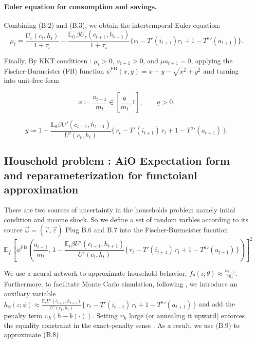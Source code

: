 \documentclass[11pt]{article}
\begin{document}
\paragraph{Euler equation for consumption and savings.}
Combining (B.2) and (B.3), we obtain the intertemporal Euler equation:
\begin{equation}
\mu_t 
= \frac{U_c(c_t,h_t)}{1+\tau_s}
- \frac{\mathbb{E}_0 \, \beta U_c(c_{t+1},h_{t+1})}{1+\tau_s}
\Big\{ r_t - T'(i_{t+1})r_t + 1 - {T^a}'(a_{t+1}) \Big\}.
\end{equation}

Finally, By KKT conditiosn : $\mu_t>0$, $a_{t+1}>0$, and $\mu a_{t+1}=0$, applying the Fischer-Burmeister (FB) function $\psi^{\text{FB}}(x, y) = x+y-\sqrt{x^2+y^2} $ and turning into unit-free form 

\begin{equation}
x \coloneqq \frac{a_{t+1}}{m_t}\in [\frac{\underline{a}}{m_t}, 1], 
\qquad \underline{a} > 0.
\end{equation}

\begin{equation}
y \coloneqq 
1 - \frac{\mathbb{E}_0 \beta U'(c_{t+1},h_{t+1})}{U'(c_t,h_t)}
\Big\{\, r_t - T'(i_{t+1})\,r_t + 1 - {T^a}'(a_{t+1}) \,\Big\}.
\end{equation}

\pagebreak

\subsection{Household problem : AiO Expectation form and reparameterization for functoianl approximation}
There are two sources of uncertainty in the households problem namely intial condition and income shock.
So we define a set of random varbles according to its source $\vec{\omega}=(\vec{\iota }, \vec{\varepsilon })$
Plug B.6 and B.7 into the Fischer-Burmeister fucntion
\begin{equation}
\mathbb{E}_{\vec{\iota}} \left[
\phi^{\text{FB}}\!\left(
\frac{a_{t+1}}{m_t},\,
1 - \frac{\mathbb{E}_{\epsilon} \beta U'(c_{t+1},h_{t+1})}{U'(c_t,h_t)}\Big\{\, r_t - T'(i_{t+1})\,r_t + 1 - {T^a}'(a_{t+1}) \,\Big\}
\right)
\right]^{2}
\end{equation}

We use a neural network to approximate household behavior,
$f_\theta(\iota;\theta) \approx \frac{a_{t+1}}{m_t}$. Furthermore, to
facilitate Monte Carlo simulation, following \cite{FiaccoMcCormick1968},
we introduce an auxiliary variable $h_\phi(\iota;\phi) \approx \frac{\mathbb{E}_{\epsilon} U'(c_{t+1},h_{t+1})}{U'(c_t,h_t)}\Big\{\, r_t - T'(i_{t+1})\,r_t + 1 - {T^a}'(a_{t+1}) \,\Big\}$ and add the
penalty term $\upsilon_h\!\left(h - b(\cdot)\right)$. Setting $\upsilon_h$
large (or annealing it upward) enforces the equality constraint in the
exact-penalty sense \cite{nocedal2006numerical}. As a result, we use (B.9) to approximate (B.8)
\end{document}
